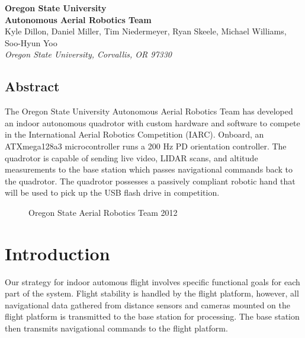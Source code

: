 \documentclass[12pt,letterpaper]{article}
\begin{document}
\begin{center}
{
    \bfseries\huge
    Oregon State University \\
    Autonomous Aerial Robotics Team \\ [1em]
}
{
    \small
    Kyle Dillon, Daniel Miller, Tim Niedermeyer, Ryan Skeele, Michael Williams, Soo-Hyun Yoo \\ [0.5em]
    \emph{Oregon State University, Corvallis, OR 97330}
}
\end{center}

\begin{center}
\begin{minipage}{5.5in}

\section*{Abstract}

The Oregon State University Autonomous Aerial Robotics Team has developed an
indoor autonomous quadrotor with custom hardware and software to compete in the
International Aerial Robotics Competition (IARC). Onboard, an ATXmega128a3
microcontroller runs a 200 Hz PD orientation controller. The quadrotor is
capable of sending live video, LIDAR scans, and altitude measurements to the
base station which passes navigational commands back to the quadrotor. The
quadrotor possesses a passively compliant robotic hand that will be used to
pick up the USB flash drive in competition.

\end{minipage}
\end{center}


\begin{figure}[h!]
    \caption{Oregon State Aerial Robotics Team 2012}
\end{figure}


\section*{Introduction}

Our strategy for indoor automous flight involves specific functional goals for
each part of the system. Flight stability is handled by the flight platform,
however, all navigational data gathered from distance sensors and cameras
mounted on the flight platform is transmitted to the base station for
processing. The base station then transmits navigational commands to the flight
platform.
\end{document}
